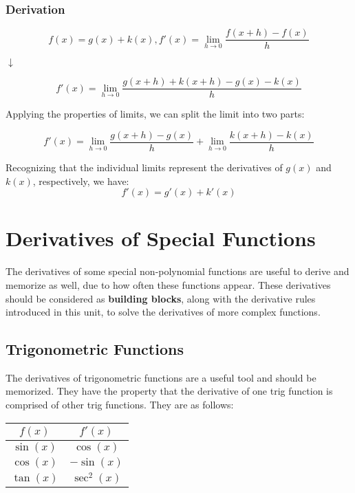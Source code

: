 \documentclass[11pt]{article}
\begin{document}
\subsubsection{Derivation}
\[f(x) = g(x) + k(x), f'(x) = \lim_{{h \to 0}} \frac{{f(x + h) - f(x)}}{{h}}\]
\begin{center}
$\downarrow$
\end{center}
\[f'(x) = \lim_{{h \to 0}} \frac{{g(x + h) + k(x + h) - g(x) - k(x)}}{{h}}\]

Applying the properties of limits, we can split the limit into two parts:

\[f'(x) = \lim_{{h \to 0}} \frac{{g(x + h) - g(x)}}{{h}} + \lim_{{h \to 0}} \frac{{k(x + h) - k(x)}}{{h}}\]

Recognizing that the individual limits represent the derivatives of \(g(x)\) and \(k(x)\), respectively, we have:
\[f'(x) = g'(x) + k'(x)\]


\section{Derivatives of Special Functions}
The derivatives of some special non-polynomial functions are useful to derive and memorize as well, due to how often these functions appear. These derivatives should be considered as \textbf{building blocks}, along with the derivative rules introduced in this unit, to solve the derivatives of more complex functions.

\subsection{Trigonometric Functions}
The derivatives of trigonometric functions are a useful tool and should be memorized. They have the property that the derivative of one trig function is comprised of other trig functions. They are as follows:

\begin{table}[H]
    \centering
    \begin{tabular}{|c|c|}
        \hline
        $f(x)$ & $f'(x)$ \\
        \hline
        $\sin{(x)}$ & $\cos{(x)}$ \\ 
        $\cos{(x)}$ & $-\sin{(x)}$ \\
        $\tan{(x)}$ & $\sec^{2}{(x)}$ \\
        \hline
    \end{tabular}
\end{table}
\end{document}
